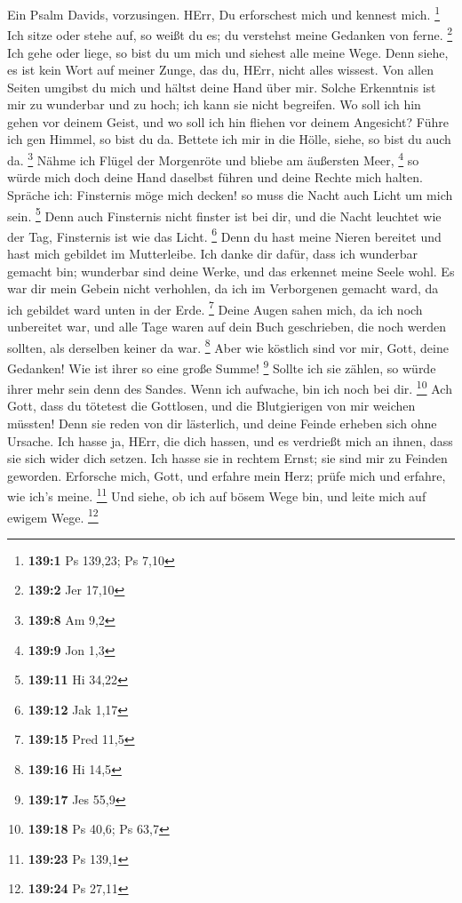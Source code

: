  Ein Psalm Davids, vorzusingen. HErr, Du erforschest mich
und kennest mich. \footnote{\textbf{139:1} Ps 139,23; Ps 7,10}
 Ich sitze oder stehe auf, so weißt du es; du verstehst
meine Gedanken von ferne. \footnote{\textbf{139:2} Jer 17,10}
 Ich gehe oder liege, so bist du um mich und siehest alle
meine Wege.  Denn siehe, es ist kein Wort auf meiner
Zunge, das du, HErr, nicht alles wissest.  Von allen
Seiten umgibst du mich und hältst deine Hand über mir. 
Solche Erkenntnis ist mir zu wunderbar und zu hoch; ich kann sie nicht
begreifen.  Wo soll ich hin gehen vor deinem Geist, und wo
soll ich hin fliehen vor deinem Angesicht?  Führe ich gen
Himmel, so bist du da. Bettete ich mir in die Hölle, siehe, so bist du
auch da. \footnote{\textbf{139:8} Am 9,2}  Nähme ich
Flügel der Morgenröte und bliebe am äußersten Meer, \footnote{\textbf{139:9}
  Jon 1,3}  so würde mich doch deine Hand daselbst führen
und deine Rechte mich halten.  Spräche ich: Finsternis
möge mich decken! so muss die Nacht auch Licht um mich sein. \footnote{\textbf{139:11}
  Hi 34,22}  Denn auch Finsternis nicht finster ist bei
dir, und die Nacht leuchtet wie der Tag, Finsternis ist wie das Licht.
\footnote{\textbf{139:12} Jak 1,17}  Denn du hast meine
Nieren bereitet und hast mich gebildet im Mutterleibe. 
Ich danke dir dafür, dass ich wunderbar gemacht bin; wunderbar sind
deine Werke, und das erkennet meine Seele wohl.  Es war
dir mein Gebein nicht verhohlen, da ich im Verborgenen gemacht ward, da
ich gebildet ward unten in der Erde. \footnote{\textbf{139:15} Pred 11,5}
 Deine Augen sahen mich, da ich noch unbereitet war, und
alle Tage waren auf dein Buch geschrieben, die noch werden sollten, als
derselben keiner da war. \footnote{\textbf{139:16} Hi 14,5}
 Aber wie köstlich sind vor mir, Gott, deine Gedanken!
Wie ist ihrer so eine große Summe! \footnote{\textbf{139:17} Jes 55,9}
 Sollte ich sie zählen, so würde ihrer mehr sein denn des
Sandes. Wenn ich aufwache, bin ich noch bei dir. \footnote{\textbf{139:18}
  Ps 40,6; Ps 63,7}  Ach Gott, dass du tötetest die
Gottlosen, und die Blutgierigen von mir weichen müssten! 
Denn sie reden von dir lästerlich, und deine Feinde erheben sich ohne
Ursache.  Ich hasse ja, HErr, die dich hassen, und es
verdrießt mich an ihnen, dass sie sich wider dich setzen.
 Ich hasse sie in rechtem Ernst; sie sind mir zu Feinden
geworden.  Erforsche mich, Gott, und erfahre mein Herz;
prüfe mich und erfahre, wie ich's meine. \footnote{\textbf{139:23} Ps
  139,1}  Und siehe, ob ich auf bösem Wege bin, und leite
mich auf ewigem Wege. \footnote{\textbf{139:24} Ps 27,11}

